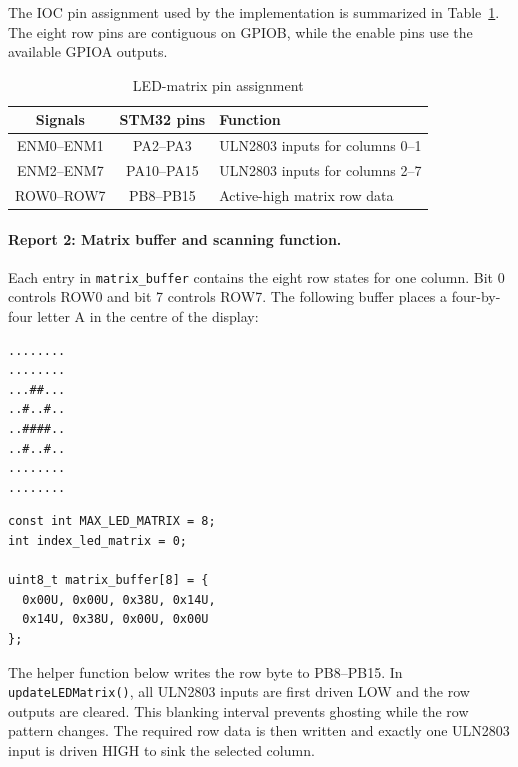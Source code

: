 The IOC pin assignment used by the implementation is summarized in
Table~\ref{tab:lab2-ex9-pins}. The eight row pins are contiguous on GPIOB,
while the enable pins use the available GPIOA outputs.

\begin{table}[!htp]
    \centering
    \caption{LED-matrix pin assignment}
    \label{tab:lab2-ex9-pins}
    \begin{tabular}{c|c|l}
        \textbf{Signals} & \textbf{STM32 pins} & \textbf{Function}\\
        \hline
        ENM0--ENM1 & PA2--PA3 & ULN2803 inputs for columns 0--1\\
        ENM2--ENM7 & PA10--PA15 & ULN2803 inputs for columns 2--7\\
        ROW0--ROW7 & PB8--PB15 & Active-high matrix row data\\
    \end{tabular}
\end{table}

\paragraph{Report 2: Matrix buffer and scanning function.}

Each entry in \texttt{matrix\_buffer} contains the eight row states for one
column. Bit 0 controls ROW0 and bit 7 controls ROW7. The following buffer
places a four-by-four letter A in the centre of the display:

\begin{verbatim}
........
........
...##...
..#..#..
..####..
..#..#..
........
........
\end{verbatim}

\begin{lstlisting}[caption={Centered four-by-four letter A stored column-wise}]
const int MAX_LED_MATRIX = 8;
int index_led_matrix = 0;

uint8_t matrix_buffer[8] = {
  0x00U, 0x00U, 0x38U, 0x14U,
  0x14U, 0x38U, 0x00U, 0x00U
};
\end{lstlisting}

The helper function below writes the row byte to PB8--PB15. In
\texttt{updateLEDMatrix()}, all ULN2803 inputs are first driven LOW and the row
outputs are cleared. This blanking interval prevents ghosting while the row
pattern changes. The required row data is then written and exactly one ULN2803
input is driven HIGH to sink the selected column.


